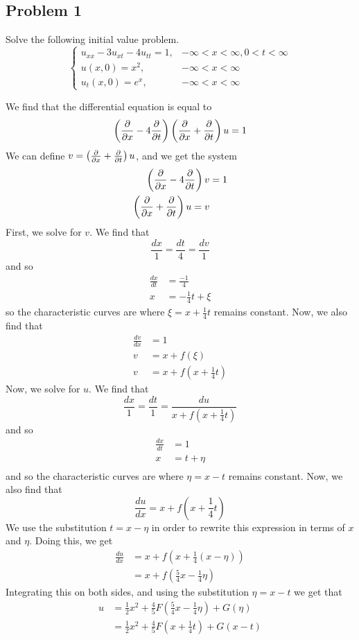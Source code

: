 \documentclass{ben}
\begin{document}
\subsection{Problem 1}
Solve the following initial value problem.
\[
\begin{cases}
    u_{xx} - 3u_{xt} - 4u_{tt} = 1, & -\infty < x < \infty, 0 < t < \infty\\
    u(x, 0) = x^2, & -\infty < x < \infty\\
    u_t(x, 0) = e^x, & -\infty < x < \infty
\end{cases}
\]
\begin{solution}
  We find that the differential equation is equal to
  \[
    \left( \frac{\partial }{\partial x} - 4 \frac{\partial }{\partial t} \right) \left( \frac{\partial }{\partial x} + \frac{\partial }{\partial t} \right)u = 1
  \]
  We can define $v = \left( \frac{\partial }{\partial x} + \frac{\partial }{\partial t} \right)u$, and we get the system
  \begin{align*}
    \left( \frac{\partial }{\partial x} - 4 \frac{\partial }{\partial t} \right)v &= 1\\
    \left( \frac{\partial }{\partial x} + \frac{\partial }{\partial t} \right)u = v
  \end{align*}
  First, we solve for $v$. We find that
  \[
    \frac{dx}{1} = \frac{dt}{4} = \frac{dv}{1}
  \]
  and so
  \begin{align*}
    \frac{dx}{dt} &= \frac{-1}{4}\\
    x &= -\frac{1}{4}t + \xi
  \end{align*}
  so the characteristic curves are where $\xi = x + \frac{1}{4}t$ remains constant.
  Now, we also find that
  \begin{align*}
    \frac{dv}{dx} &= 1\\
    v &= x + f(\xi)\\
    v &= x + f \left( x + \frac{1}{4}t \right)
  \end{align*}
  Now, we solve for $u$. We find that
  \[
    \frac{dx}{1} = \frac{dt}{1} = \frac{du}{x + f \left( x + \frac{1}{4}t \right)}
  \]
  and so
  \begin{align*}
    \frac{dx}{dt} &= 1\\
    x &= t + \eta\\
  \end{align*}
  and so the characteristic curves are where $\eta = x - t$ remains constant.
  Now, we also find that
  \[
    \frac{du}{dx} = x + f \left( x + \frac{1}{4}t \right)
  \]
  We use the substitution $t = x - \eta$ in order to rewrite this expression in terms of $x$ and
  $\eta$. Doing this, we get
  \begin{align*}
    \frac{du}{dx} &= x + f \left( x + \frac{1}{4}(x - \eta) \right)\\
                  &= x + f \left( \frac{5}{4}x - \frac{1}{4}\eta \right)
  \end{align*}
  Integrating this on both sides, and using the substitution $\eta = x - t$ we get that
  \begin{align*}
    u &= \frac{1}{2} x^2 + \frac{4}{5} F \left( \frac{5}{4} x - \frac{1}{4} \eta \right) + G(\eta)\\
      &= \frac{1}{2} x^2 + \frac{4}{5} F \left( x + \frac{1}{4}t \right) + G(x - t)
  \end{align*}
\end{solution}
\end{document}
